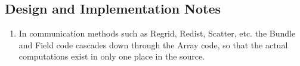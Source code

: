 
\subsection{Design and Implementation Notes}

\begin{enumerate}

\item In communication methods such as Regrid, Redist, Scatter, etc. 
the Bundle and Field code cascades down through the Array code, so 
that the actual computations exist in only one place in the source.

\end{enumerate}
